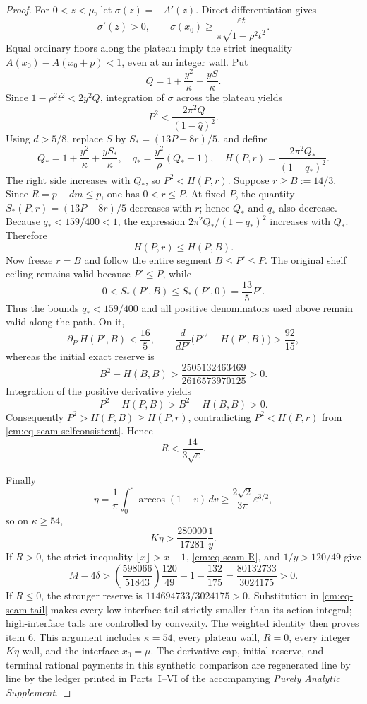 \documentclass[11pt]{article}
\numberwithin{equation}{section}
\theoremstyle{definition}
\theoremstyle{remark}
\begin{document}
\begin{proof}
For \(0<z<\mu\), let \(\sigma(z)=-A'(z)\).  Direct differentiation gives
\[
 \sigma'(z)>0,\qquad
 \sigma(x_0)\geq
 \frac{\varepsilon t}{\pi\sqrt{1-\rho^2t^2}}.
\]
Equal ordinary floors along the plateau imply the strict inequality
\(A(x_0)-A(x_0+p)<1\), even at an integer wall.  Put
\[
 Q=1+\frac{y^2}{\kappa}+\frac{yS}{\kappa}.
\]
Since \(1-\rho^2t^2<2y^2Q\), integration of \(\sigma\) across the
plateau yields
\begin{equation}
 P^2<\frac{2\pi^2Q}{(1-\widehat q)^2}.
 \label{cm:eq-seam-selfconsistent}
\end{equation}
Using \(d>5/8\), replace
\(S\) by \(S_*=(13P-8r)/5\), and define
\[
 Q_*=1+\frac{y^2}{\kappa}+\frac{yS_*}{\kappa},
 \quad q_*=\frac{y^2}{\rho}(Q_*-1),
 \quad H(P,r)=\frac{2\pi^2Q_*}{(1-q_*)^2}.
\]
The right side increases with \(Q_*\), so
\(P^2<H(P,r)\).  Suppose \(r\geq B:=14/3\).  Since
\(R=p-dm\leq p\), one has \(0<r\leq P\).  At fixed \(P\), the quantity
\(S_*(P,r)=(13P-8r)/5\) decreases with \(r\); hence \(Q_*\) and \(q_*\)
also decrease.  Because \(q_*<159/400<1\), the expression
\(2\pi^2Q_*/(1-q_*)^2\) increases with \(Q_*\).  Therefore
\[
 H(P,r)\leq H(P,B).
\]
Now freeze \(r=B\) and follow the entire segment \(B\leq P'\leq P\).
The original shelf ceiling remains valid because \(P'\leq P\), while
\[
 0<S_*(P',B)\leq S_*(P',0)=\frac{13}{5}P'.
\]
Thus the bounds \(q_*<159/400\) and all positive denominators used above
remain valid along the path.  On it,
\[
 \partial_{P'}H(P',B)<\frac{16}{5},\qquad
 \frac{d}{dP'}\bigl(P'^2-H(P',B)\bigr)>\frac{92}{15},
\]
whereas the initial exact reserve is
\[
 B^2-H(B,B)>
 \frac{2505132463469}{2616573970125}>0.
\]
Integration of the positive derivative yields
\[
 P^2-H(P,B)>B^2-H(B,B)>0.
\]
Consequently \(P^2>H(P,B)\geq H(P,r)\), contradicting
\(P^2<H(P,r)\) from \eqref{cm:eq-seam-selfconsistent}.  Hence
\begin{equation}
 R<\frac{14}{3\sqrt\varepsilon}.
 \label{cm:eq-seam-R}
\end{equation}

Finally
\[
 \eta=\frac1\pi\int_0^\varepsilon\arccos(1-v)\,dv
 \geq\frac{2\sqrt2}{3\pi}\varepsilon^{3/2},
\]
so on \(\kappa\geq54\),
\[
 K\eta>\frac{280000}{17281}\frac1y.
\]
If \(R>0\), the strict inequality \(\lfloor x\rfloor>x-1\),
\eqref{cm:eq-seam-R}, and \(1/y>120/49\) give
\[
 M-4\delta>
 \left(\frac{598066}{51843}\right)\frac{120}{49}
 -1-\frac{132}{175}
 =\frac{80132733}{3024175}>0.
\]
If \(R\leq0\), the stronger reserve is
\(114694733/3024175>0\).  Substitution in
\eqref{cm:eq-seam-tail} makes every low-interface tail strictly smaller
than its action integral; high-interface tails are controlled by convexity.
The weighted identity then proves item 6.  This argument includes
\(\kappa=54\), every plateau wall, \(R=0\), every integer
\(K\eta\) wall, and the interface \(x_0=\mu\).
The derivative cap, initial reserve, and terminal rational payments in this
synthetic comparison are regenerated line by line by the ledger printed in
  Parts~I--VI of the accompanying \emph{Purely Analytic Supplement}.


\end{proof}
\end{document}
